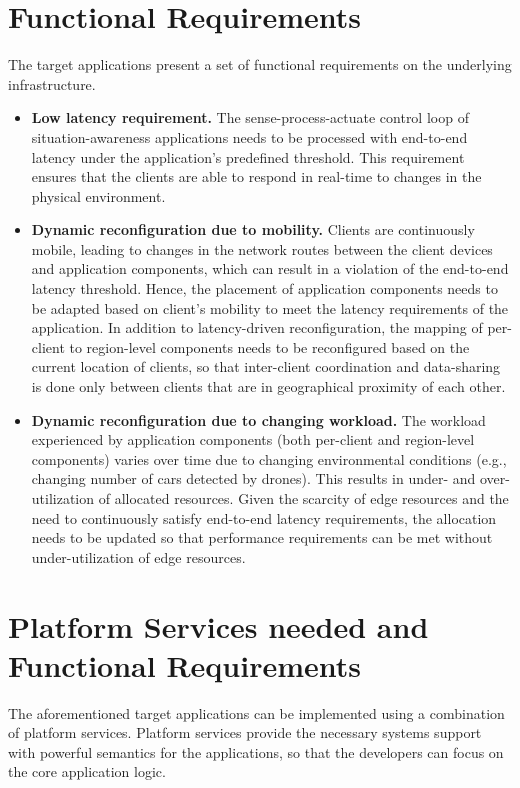 \section{Functional Requirements}
The target applications present a set of functional requirements on the underlying infrastructure. 
\begin{itemize}
\item \textbf{Low latency requirement. } The sense-process-actuate control loop of situation-awareness applications needs to be processed with end-to-end latency under the application's predefined threshold. This requirement ensures that the clients are able to respond in real-time to changes in the physical environment.
\item \textbf{Dynamic reconfiguration due to mobility. } Clients are continuously mobile, leading to changes in the network routes between the client devices and application components, which can result in a violation of the end-to-end latency threshold. Hence, the placement of application components needs to be adapted based on client's mobility to meet the latency requirements of the application. In addition to latency-driven reconfiguration, the mapping of per-client to region-level components needs to be reconfigured based on the current location of clients, so that inter-client coordination and data-sharing is done only between clients that are in geographical proximity of each other.
\item \textbf{Dynamic reconfiguration due to changing workload.} The workload experienced by application components (both per-client and region-level components) varies over time due to changing environmental conditions (e.g., changing number of cars detected by drones). This results in under- and over-utilization of allocated resources. Given the scarcity of edge resources and the need to continuously satisfy end-to-end latency requirements, the allocation needs to be updated so that performance requirements can be met without under-utilization of edge resources.
\end{itemize}
\section{Platform Services needed and Functional Requirements}
The aforementioned target applications can be implemented using a combination of platform services. Platform services provide the necessary systems support with powerful semantics for the applications, so that the developers can focus on the core application logic.

